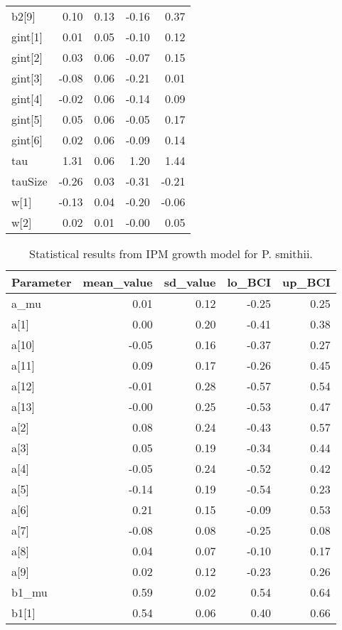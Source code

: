 \documentclass[12pt,]{article}
\begin{document}
\begin{table}[ht]
{\begin{tabular}{lrrrr}
  b2[9] & 0.10 & 0.13 & -0.16 & 0.37 \\ 
  gint[1] & 0.01 & 0.05 & -0.10 & 0.12 \\ 
  gint[2] & 0.03 & 0.06 & -0.07 & 0.15 \\ 
  gint[3] & -0.08 & 0.06 & -0.21 & 0.01 \\ 
  gint[4] & -0.02 & 0.06 & -0.14 & 0.09 \\ 
  gint[5] & 0.05 & 0.06 & -0.05 & 0.17 \\ 
  gint[6] & 0.02 & 0.06 & -0.09 & 0.14 \\ 
  tau & 1.31 & 0.06 & 1.20 & 1.44 \\ 
  tauSize & -0.26 & 0.03 & -0.31 & -0.21 \\ 
  w[1] & -0.13 & 0.04 & -0.20 & -0.06 \\ 
  w[2] & 0.02 & 0.01 & -0.00 & 0.05 \\ 
   \hline
\end{tabular}
}
\end{table}\begin{table}[ht]
\centering
\caption{Statistical results from IPM growth model for P. smithii.} 
{\footnotesize
\begin{tabular}{lrrrr}
  \hline
Parameter & mean\_value & sd\_value & lo\_BCI & up\_BCI \\ 
  \hline
a\_mu & 0.01 & 0.12 & -0.25 & 0.25 \\ 
  a[1] & 0.00 & 0.20 & -0.41 & 0.38 \\ 
  a[10] & -0.05 & 0.16 & -0.37 & 0.27 \\ 
  a[11] & 0.09 & 0.17 & -0.26 & 0.45 \\ 
  a[12] & -0.01 & 0.28 & -0.57 & 0.54 \\ 
  a[13] & -0.00 & 0.25 & -0.53 & 0.47 \\ 
  a[2] & 0.08 & 0.24 & -0.43 & 0.57 \\ 
  a[3] & 0.05 & 0.19 & -0.34 & 0.44 \\ 
  a[4] & -0.05 & 0.24 & -0.52 & 0.42 \\ 
  a[5] & -0.14 & 0.19 & -0.54 & 0.23 \\ 
  a[6] & 0.21 & 0.15 & -0.09 & 0.53 \\ 
  a[7] & -0.08 & 0.08 & -0.25 & 0.08 \\ 
  a[8] & 0.04 & 0.07 & -0.10 & 0.17 \\ 
  a[9] & 0.02 & 0.12 & -0.23 & 0.26 \\ 
  b1\_mu & 0.59 & 0.02 & 0.54 & 0.64 \\ 
  b1[1] & 0.54 & 0.06 & 0.40 & 0.66 \\ 

\end{tabular}}
\end{table}
\end{document}
